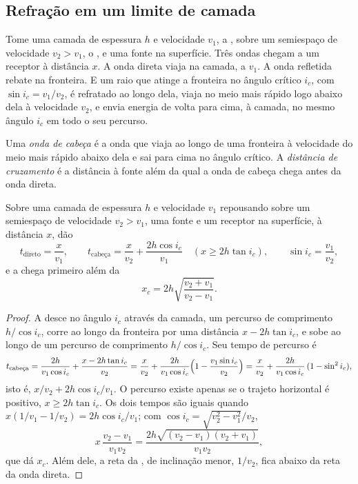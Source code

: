 \subsection{Refração em um limite de camada}

Tome uma camada de espessura $h$ e velocidade $v_1$, a , sobre um semiespaço de velocidade $v_2 > v_1$, o , e uma fonte na superfície. Três ondas chegam a um receptor à distância $x$. A onda direta viaja na camada, a $v_1$. A onda refletida rebate na fronteira. E um raio que atinge a fronteira no ângulo crítico $i_c$, com $\sin i_c = v_1/v_2$, é refratado ao longo dela, viaja no meio mais rápido logo abaixo dela à velocidade $v_2$, e envia energia de volta para cima, à camada, no mesmo ângulo $i_c$ em todo o seu percurso.

\begin{definition}\label{def:b1:layered-earth:head-wave}
Uma \emph{onda de cabeça} é a onda que viaja ao longo de uma fronteira à velocidade do meio mais rápido abaixo dela e sai para cima no ângulo crítico. A \emph{distância de cruzamento} é a distância à fonte além da qual a onda de cabeça chega antes da onda direta.
\end{definition}

\begin{theorem}\label{thm:b1:layered-earth:two-layer}
Sobre uma camada de espessura $h$ e velocidade $v_1$ repousando sobre um semiespaço de velocidade
$v_2 > v_1$, uma fonte e um receptor na superfície, à distância $x$, dão
\[
  t_{\text{direto}} = \frac{x}{v_1}, \qquad
  t_{\text{cabeça}} = \frac{x}{v_2} + \frac{2h\cos i_c}{v_1}
  \quad (x \ge 2h\tan i_c), \qquad \sin i_c = \frac{v_1}{v_2},
\]
e a  chega primeiro além da 
\[
  x_c = 2h\sqrt{\frac{v_2 + v_1}{v_2 - v_1}}.
\]
\end{theorem}

\begin{proof}
A  desce no ângulo $i_c$ através da camada, um percurso de comprimento
$h/\cos i_c$, corre ao longo da fronteira por uma distância $x - 2h\tan i_c$, e sobe ao longo de um percurso de comprimento $h/\cos i_c$. Seu tempo de percurso é
\[
  t_{\text{cabeça}} = \frac{2h}{v_1\cos i_c} + \frac{x - 2h\tan i_c}{v_2}
  = \frac{x}{v_2} + \frac{2h}{v_1\cos i_c}\Bigl(1 - \frac{v_1\sin i_c}{v_2}\Bigr)
  = \frac{x}{v_2} + \frac{2h}{v_1\cos i_c}\,(1 - \sin^2 i_c),
\]
isto é, $x/v_2 + 2h\cos i_c/v_1$. O percurso existe apenas se o trajeto horizontal é positivo, $x \ge 2h\tan i_c$. Os dois tempos são iguais quando
$x(1/v_1 - 1/v_2) = 2h\cos i_c/v_1$; com $\cos i_c = \sqrt{v_2^2 - v_1^2}/v_2$,
\[
  x\,\frac{v_2 - v_1}{v_1 v_2} = \frac{2h\sqrt{(v_2 - v_1)(v_2 + v_1)}}{v_1 v_2},
\]
que dá $x_c$. Além dele, a reta da , de inclinação menor, $1/v_2$, fica abaixo da reta da onda direta.
\end{proof}

